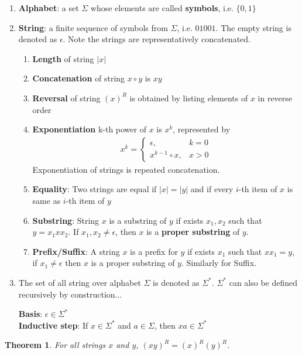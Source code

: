 \documentclass[11pt]{article}
\theoremstyle{plain}%
\newtheorem{theorem}{Theorem}[section]
\theoremstyle{definition}
\theoremstyle{remark}
\begin{document}
\begin{enumerate}
  \item \textbf{Alphabet}: a set $\Sigma$ whose elements are called \textbf{symbols}, i.e. $\{0, 1\}$
  \item \textbf{String}: a finite sequence of symbols from $\Sigma$, i.e. $01001$. The empty string is denoted as $\epsilon$. Note the strings are representatively concatenated.
  \begin{enumerate}
    \item \textbf{Length} of string $| x |$
    \item \textbf{Concatenation} of string $x\circ y$ is $xy$
    \item \textbf{Reversal} of string $(x)^R$ is obtained by listing elements of $x$ in reverse order
    \item \textbf{Exponentiation} k-th power of $x$ is $x^k$, represented by
    \begin{align*}
      x^k =
      \begin{cases}
        \epsilon, & k=0\\
        x^{k-1}\circ x, &x>0
      \end{cases}
    \end{align*}
    Exponentiation of strings is repeated concatenation.
    \item \textbf{Equality}: Two strings are equal if $|x| = |y|$ and if every $i$-th item of $x$ is same as $i$-th item of $y$
    \item \textbf{Substring}: String $x$ is a substring of $y$ if exists $x_1, x_2$ such that $y=x_1 x x_2$. If $x_1,x_2\neq \epsilon$, then $x$ is a \textbf{proper substring} of $y$.
    \item \textbf{Prefix/Suffix}: A string $x$ is a prefix for $y$ if exists $x_1$ such that $x x_1 = y$, if $x_1 \neq \epsilon$ then $x$ is a proper substring of $y$. Similarly for Suffix.
  \end{enumerate}
  \item The set of all string over alphabet $\Sigma$ is denoted as $\Sigma^*$. $\Sigma^*$ can also be defined recursively by construction...
  \begin{center}
    \textbf{Basis}: $\epsilon \in \Sigma^*$\\
    \textbf{Inductive step}: If $x\in \Sigma^*$ and $a\in \Sigma$, then $xa\in \Sigma^*$
  \end{center}
\end{enumerate}

\begin{theorem}
  For all strings $x$ and $y$, $(xy)^R = (x)^R (y)^R$.
\end{theorem}
\end{document}
